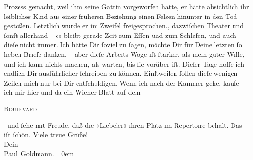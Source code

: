\begin{ledgroupsized}[t]{13cm}
{{{                  Prozess gemacht, weil ihm seine Gattin vorgeworfen hatte, er hätte absichtlich ihr
                  leibliches Kind aus einer
                  früheren Beziehung einen Felsen hinunter in den Tod gestoßen. Letztlich wurde er
                  im Zweifel freigesprochen.}}}\label{K_L02754-999h}, dazwiſchen Theater und ſonſt allerhand – es
               bleibt gerade Zeit zum Eſſen und zum Schlafen, und auch dieſe nicht immer. Ich hätte Dir ſoviel zu ſagen, möchte Dir für Deine
               letzten ſo lieben Briefe danken, – aber dieſe Arbeits-Woge iſt ſtärker, als mein
               guter Wille, und ich kann nichts machen, als warten, bis ſie vorüber iſt. Dieſer Tage
               hoffe ich endlich Dir ausführlicher ſchreiben zu können. Einſtweilen ſollen dieſe
               wenigen Zeilen mich nur bei Dir entſchuldigen. Wenn ich nach der Kammer gehe, kaufe ich mir hier und da ein
                  Wiener Blatt auf dem \begin{otherlanguage}{french}\textsc{Boulevard}\end{otherlanguage} und ſehe mit Freude, daß die »Liebelei«  ihren {\pb}Platz im Repertoire behält. \strikeout{\textcolor{gray}{×}\-\textcolor{gray}{×}\-\textcolor{gray}{×}\-\textcolor{gray}{×}\-\textcolor{gray}{×}} Das iſt ſchön.\pend
           \pstart
           Viele treue Grüße! {\\[\baselineskip]}Dein {\\[\baselineskip]}\spacefill\mbox{Paul Goldmann.}\pend
           \leftskip=0em{}
         
         \endnumbering{}\end{ledgroupsized}  \newcommand{\dateiname}{L02754}\newcommand{\titel}{Paul Goldmann an Arthur Schnitzler, 6. 11. [1895]}\newcommand{\editorInnen}{Martin Anton Müller und Laura Untner}
      